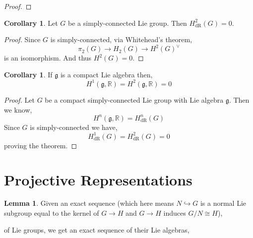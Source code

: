 \documentclass[12pt]{extarticle}
\newcommand{\R}{\mathbb{R}}
\theoremstyle{definition}
\newtheorem{lemma}[theorem]{Lemma}
\newtheorem{corollary}[theorem]{Corollary}
\newcommand{\g}{\mathfrak{g}}
\newcommand{\h}{\mathfrak{h}}
\newcommand{\embed}{\hookrightarrow}
\begin{document}
\begin{proof}

\end{proof}

\begin{corollary}
Let $G$ be a simply-connected Lie group. Then $H^2_{\text{dR}}(G) = 0$.
\end{corollary}

\begin{proof}
Since $G$ is simply-connected, via Whitehead's theorem,
\[ \pi_2(G) \to H_2(G) \to H^2(G)^\vee \]
is an isomorphism. And thus $H^2(G) = 0$.
\end{proof}

\begin{corollary}
If $\g$ is a compact Lie algebra then,
\[ H^1(\g, \R) = H^2(\g, \R) = 0 \]
\end{corollary}

\begin{proof}
Let $G$ be a compact simply-connected Lie group with Lie algebra $\g$. Then we know,
\[ H^n(\g, \R) = H^n_{\mathrm{dR}}(G) \]
Since $G$ is simply-connected we have,
\[ H^1_{\mathrm{dR}}(G) = H^2_{\mathrm{dR}}(G) = 0 \]
proving the theorem. 
\end{proof}


\section{Projective Representations}

\begin{lemma}
Given an exact sequence (which here means $N \embed G$ is a normal Lie subgroup equal to the kernel of $G \to H$ and $G \to H$ induces $G / N \cong H$),
\begin{center}
\end{center}
of Lie groups, we get an exact sequence of their Lie algebras,
\begin{center}
\end{center}
\end{lemma}
\end{document}
